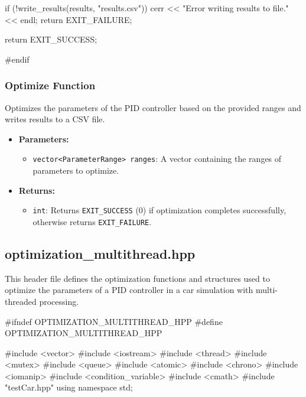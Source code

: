 \documentclass[a4paper,12pt]{report}
\begin{document}
\begin{lstlising}[language=C++]
\begin{lstlising}[language=C++]
{{{{{{{{{{{{                                                                                        }
                                                                                }
                                                                        }
                                                                }
                                                        }
                                                }
                                        }
                                }
                        }
                }
        }

        if (!write_results(results, "results.csv"))
        {
                cerr << "Error writing results to file." << endl;
                return EXIT_FAILURE;
        }

        return EXIT_SUCCESS;
}

#endif
\end{lstlising}
\subsubsection{Optimize Function}
Optimizes the parameters of the PID controller based on the provided ranges and writes results to a CSV file.
\begin{itemize}
\item \textbf{Parameters:}
\begin{itemize}
\item \texttt{vector<ParameterRange> ranges}: A vector containing the ranges of parameters to optimize.
\end{itemize}
\item \textbf{Returns:}
\begin{itemize}
\item \texttt{int}: Returns \texttt{EXIT\_SUCCESS} (0) if optimization completes successfully, otherwise returns \texttt{EXIT\_FAILURE}.
\end{itemize}
\end{itemize}
\subsection{optimization\_multithread.hpp}
This header file defines the optimization functions and structures used to optimize the parameters of a PID controller in a car simulation with multi-threaded processing.
\begin{lstlising}[language=C++]
#ifndef OPTIMIZATION_MULTITHREAD_HPP
#define OPTIMIZATION_MULTITHREAD_HPP

#include <vector>
#include <iostream>
#include <thread>
#include <mutex>
#include <queue>
#include <atomic>
#include <chrono>
#include <iomanip>
#include <condition_variable>
#include <cmath>
#include "testCar.hpp"
using namespace std;


\end{lstlising}
\end{lstlising}
\end{document}
